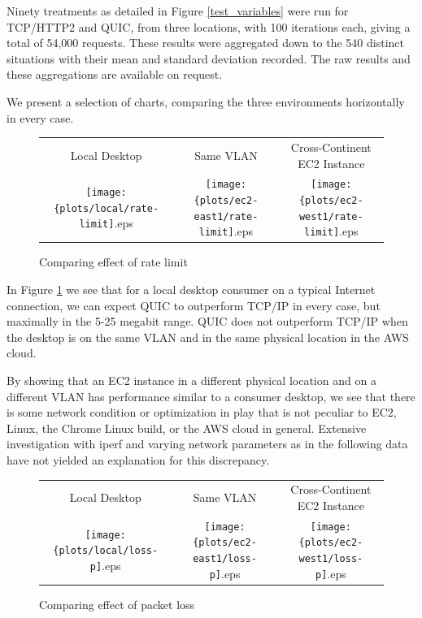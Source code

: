 \documentclass[12pt]{article}
\begin{document}
Ninety treatments as detailed in Figure \ref{test_variables} were run for TCP/HTTP2 and QUIC, from three locations, with 100 iterations each, giving a total of 54,000 requests. These results were aggregated down to the 540 distinct situations with their mean and standard deviation recorded. The raw results and these aggregations are available on request.

We present a selection of charts, comparing the three environments horizontally in every case.

\begin{figure}[h]
\centering
\begin{tabular}{c c c}
	Local Desktop & Same VLAN & Cross-Continent EC2 Instance \\
	\texttt{[image: \{plots/local/rate-limit]}.eps} &
	\texttt{[image: \{plots/ec2-east1/rate-limit]}.eps} &
	\texttt{[image: \{plots/ec2-west1/rate-limit]}.eps} \\
\end{tabular}
\caption{Comparing effect of rate limit}
\label{figs:rate_limit}
\end{figure}

In Figure \ref{figs:rate_limit} we see that for a local desktop consumer on a typical Internet connection, we can expect QUIC to outperform TCP/IP in every case, but maximally in the 5-25 megabit range. QUIC does not outperform TCP/IP when the desktop is on the same VLAN and in the same physical location in the AWS cloud.

By showing that an EC2 instance in a different physical location and on a different VLAN has performance similar to a consumer desktop, we see that there is some network condition or optimization in play that is not peculiar to EC2, Linux, the Chrome Linux build, or the AWS cloud in general. Extensive investigation with iperf and varying network parameters as in the following data have not yielded an explanation for this discrepancy.


\begin{figure}[h]
\centering
\begin{tabular}{c c c}
	Local Desktop & Same VLAN & Cross-Continent EC2 Instance \\
	\texttt{[image: \{plots/local/loss-p]}.eps} &
	\texttt{[image: \{plots/ec2-east1/loss-p]}.eps} &
	\texttt{[image: \{plots/ec2-west1/loss-p]}.eps} \\
\end{tabular}
\caption{Comparing effect of packet loss}
\label{figs:packet_loss}
\end{figure}
\end{document}
